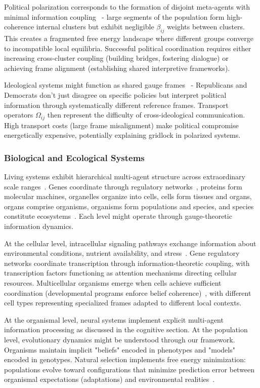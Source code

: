 \documentclass[11pt]{article}
\begin{document}
Political polarization corresponds to the formation of disjoint meta-agents with minimal information coupling~\cite{Bishop2009,Mason2018} - large segments of the population form high-coherence internal clusters but exhibit negligible $\beta_{ij}$ weights between clusters. This creates a fragmented free energy landscape where different groups converge to incompatible local equilibria. Successful political coordination requires either increasing cross-cluster coupling (building bridges, fostering dialogue) or achieving frame alignment (establishing shared interpretive frameworks).

Ideological systems might function as shared gauge frames~\cite{Converse1964,Lakoff2002} - Republicans and Democrats don't just disagree on specific policies but interpret political information through systematically different reference frames. Transport operators $\Omega_{ij}$ then represent the difficulty of cross-ideological communication. High transport costs (large frame misalignment) make political compromise energetically expensive, potentially explaining gridlock in polarized systems.

\subsubsection{Biological and Ecological Systems}

Living systems exhibit hierarchical multi-agent structure across extraordinary scale ranges~\cite{Simon1973,Levin1992}. Genes coordinate through regulatory networks~\cite{Barabasi2004,Alon2007}, proteins form molecular machines, organelles organize into cells, cells form tissues and organs, organs comprise organisms, organisms form populations and species, and species constitute ecosystems~\cite{West2006}. Each level might operate through gauge-theoretic information dynamics.

At the cellular level, intracellular signaling pathways exchange information about environmental conditions, nutrient availability, and stress~\cite{Barkai2007,Csete2002}. Gene regulatory networks coordinate transcription through information-theoretic coupling, with transcription factors functioning as attention mechanisms directing cellular resources. Multicellular organisms emerge when cells achieve sufficient coordination (developmental programs enforce belief coherence)~\cite{Wolpert2002}, with different cell types representing specialized frames adapted to different local contexts.

At the organismal level, neural systems implement explicit multi-agent information processing as discussed in the cognitive section. At the population level, evolutionary dynamics might be understood through our framework. Organisms maintain implicit "beliefs" encoded in phenotypes and "models" encoded in genotypes. Natural selection implements free energy minimization: populations evolve toward configurations that minimize prediction error between organismal expectations (adaptations) and environmental realities~\cite{Campbell2016}.
\end{document}
